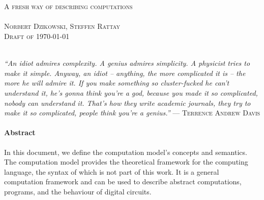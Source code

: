 \begin {center}

\vspace{1 in}
{\Huge\scshape{\tetra}\\}
{\Large~\\}
{\Large\scshape{A fresh way of describing computations\\}}
{\Huge~\\}
{\large\scshape{Norbert Dzikowski, Steffen Rattay\\
Draft of \today\\}}
{\Huge~\\}


\textit{
``An idiot admires complexity.
A genius admires simplicity.
A physicist tries to make it simple.
Anyway, an idiot -- anything, the more complicated it is -- the more he will admire it.
If you make something so cluster-fucked he can't understand it, he's gonna think you're a god, because you made it so complicated, nobody can understand it.
That's how they write academic journals, they try to make it so complicated, people think you're a genius.''}
--- {\scshape Terrence Andrew Davis}


\paragraph{Abstract}
In this document, we define the {\tetra} computation model's concepts and semantics.
The {\tetra} computation model provides the theoretical framework for the {\tetra} computing language, the syntax of which is not part of this work.
It is a general computation framework and can be used to describe abstract computations, programs, and the behaviour of digital circuits.

\end {center}
